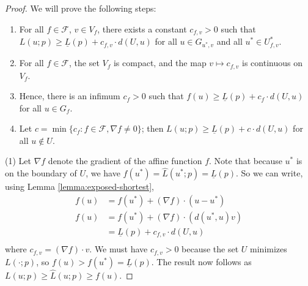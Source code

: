 \documentclass[12pt]{article}
\newcommand{\Comments}{1}
\newcommand{\mynote}[2]{\ifnum\Comments=1\textcolor{#1}{#2}\fi}
\newcommand{\bo}[1]{\mynote{blue}{[Bo: #1]}}
\newcommand{\F}{\mathcal{F}}
\newcommand{\risk}[1]{\underline{#1}}
\begin{document}
\begin{proof}
  We will prove the following steps:
  \begin{enumerate}
    \item For all $f\in\F$, $v\in V_f$, there exists a constant $c_{f,v} > 0$ such that $L(u;p) \geq \risk{L}(p) + c_{f,v} \cdot d(U,u)$ for all $u \in G_{u^*,v}$ and all $u^*\in U^*_{f,v}$.
    \item For all $f\in \F$, the set $V_f$ is compact, and the map $v \mapsto c_{f,v}$ is continuous on $V_f$.
    \item Hence, there is an infimum $c_f > 0$ such that $f(u) \geq \risk{L}(p) + c_f \cdot d(U,u)$ for all $u\in G_f$.
    \item Let $c = \min \{c_f : f\in\F, \nabla f \neq 0\}$; then $L(u;p) \geq \risk{L}(p) + c \cdot d(U,u)$ for all $u \not\in U$.
  \end{enumerate}


  (1) Let $\nabla f$ denote the gradient of the affine function $f$.
  Note that because $u^*$ is on the boundary of $U$, we have $f(u^*) = \hat{L}(u^*;p) = \risk{L}(p)$.
  So we can write, using Lemma \ref{lemma:exposed-shortest},
  \begin{align*}
    f(u) &= f(u^*) + (\nabla f)\cdot (u - u^*)  \\
    f(u) &= f(u^*) + (\nabla f)\cdot (d(u^*,u) v)  \\
         &= \risk{L}(p) + c_{f,v} \cdot d(U,u)  \\
  \end{align*}
  where $c_{f,v} = (\nabla f)\cdot v$.
  We must have $c_{f,v} > 0$ because the set $U$ minimizes $L(\cdot;p)$, so $f(u) > f(u^*) = \risk{L}(p)$.
  The result now follows as $L(u;p) \geq \hat L(u;p) \geq f(u)$.


\end{proof}
\end{document}
